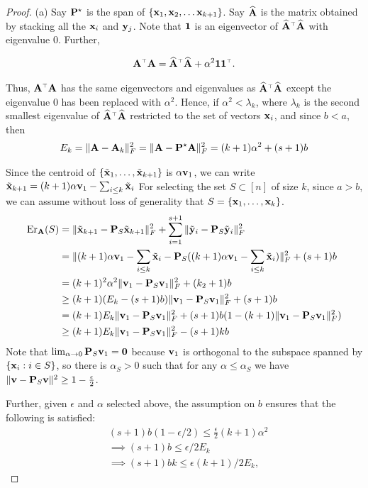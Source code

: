 \documentclass{article}
\begin{document}
\begin{proof}
(a)	Say $\P^\star$ is the span of $\{\x_1, \x_2, \ldots \x_{k+1}\}$. Say $\Abh$ is the matrix obtained by stacking all the $\x_i$ and $\y_j$. Note that $\one$ is an eigenvector of $\Abh^\top\Abh$ with eigenvalue $0$. Further,

\begin{align*}
\A^\top \A =	\Abh^\top\Abh  + \alpha^2 \one \one^\top.
\end{align*}

Thus, $\A^\top\A$ has the same eigenvectors and eigenvalues as $\Abh^\top\Abh$ except the eigenvalue $0$ has been replaced with $\alpha^2$. Hence, if $\alpha^2 < \lambda_k$, where $\lambda_k$ is the second smallest eigenvalue of $\Abh^\top\Abh$ restricted to the set of vectors $\x_i$, and since $b<a$, then
	\begin{align*}
	E_k = \|\A- \A_k\|_F^2  = \| \A - \P^\star \A \|_F^2 = (k+1)\alpha^2 + (s+1) b
		\end{align*}
	
	Since the centroid of $\{\tilde\x_1,\ldots, \tilde\x_{k+1}\}$ is $\alpha \v_1$, we can write 
	$\tilde\x_{k+1} = (k+1)\alpha\v_1 - \sum_{i\leq k} \tilde\x_i$
	For selecting the set $S\subset [n]$ of size $k$, since $a>b$, we can assume without loss of generality that $S = \{\x_1,\ldots,\x_k\}$.
	\begin{align*}
	\Er_{\A}(S) &= \| \tilde\x_{k+1}- \P_S \tilde\x_{k+1}  \|_F^2
                      +  \sum_{i=1}^{s+1}\| \tilde\y_i - \P_S
                      \tilde\y_i \|_F^2\\ 
	&=\|(k+1)\alpha\v_1 - \sum_{i\leq k}\tilde\x_i- \P_S
   ((k+1) \alpha\v_1 - \sum_{i\leq k}\tilde\x_i )\|_F^2 + (s+1)b
          \\ 
	&= (k+1)^2\alpha^2 \|\v_1 - \P_S\v_1\|^2_F + (k_2+1)b \\
	& \geq (k+1) (E_k - (s+1)b) \|\v_1 - \P_S\v_1\|^2_F + (s+1)b \\
	& = (k+1) E_k \|\v_1 - \P_S\v_1\|^2_F + (s+1)b (1 - (k+1)\|\v_1 - \P_S\v_1\|^2_F ) \\
	& \geq (k+1) E_k \|\v_1 - \P_S\v_1\|^2_F - (s+1)kb 
	\end{align*}	
	Note that $\lim_{\alpha\rightarrow 0}\P_S\v_1 = \zero$ because $\v_1$
	is orthogonal to the subspace spanned by $\{\x_i:i\in S\}$, so there is
	$\alpha_S>0$ such that for any $\alpha\leq\alpha_S$ we have
        $\|\v-\P_S\v\|^2\geq 1-\frac\epsilon2$.

Further, given $\epsilon$ and $\alpha$ selected above, the assumption on $b$ ensures that the following is satisfied: 
\begin{align*}
	&(s+1)b (1-\epsilon/2) \leq \frac{\epsilon}{2}(k+1) \alpha^2 \\
	&\implies (s+1)b \leq \epsilon/2 E_k \\
	& \implies (s+1)bk \leq \epsilon (k+1)/2 E_k,
\end{align*}


\end{proof}
\end{document}
